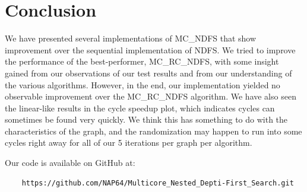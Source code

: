 \documentclass[a4paper]{article}
\begin{document}
\section{Conclusion}\label{conclusion}

We have presented several implementations of MC\_NDFS that show improvement over the sequential implementation of NDFS. We tried to improve the performance of the best-performer, MC\_RC\_NDFS, with some insight gained from our observations of our test results and from our understanding of the various algorithms. However, in the end, our implementation yielded no observable improvement over the MC\_RC\_NDFS algorithm. We have also seen the linear-like results in the cycle speedup plot, which indicates cycles can sometimes be found very quickly. We think this has something to do with the characteristics of the graph, and the randomization may happen to run into some cycles right away for all of our 5 iterations per graph per algorithm.

Our code is available on GitHub at:

\begin{verbatim}
    https://github.com/NAP64/Multicore_Nested_Depti-First_Search.git
\end{verbatim}





\end{document}
